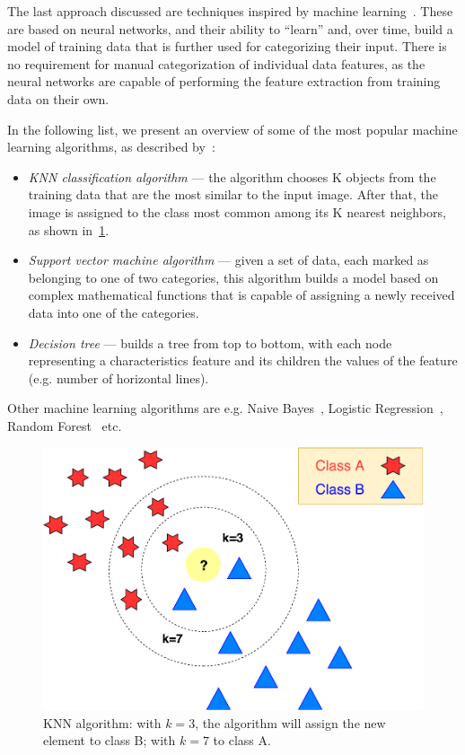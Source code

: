 The last approach discussed are techniques inspired by machine learning~\citep{sebastiani2002machine}. These are based on neural networks, and their ability to ``learn'' and, over time, build a model of training data that is further used for categorizing their input. There is no requirement for manual categorization of individual data features, as the neural networks are capable of performing the feature extraction from training data on their own.

In the following list, we present an overview of some of the most popular machine learning algorithms, as described by~\citet{bhavsar2012comparative}:
\begin{itemize}
    \item \emph{KNN classification algorithm} --- the algorithm chooses K objects from the training data that are the most similar to the input image. After that, the image is assigned to the class most common among its K nearest neighbors, as shown in~\cref{fig:characterClassKNN}.
    \item \emph{Support vector machine algorithm} --- given a set of data, each marked as belonging to one of two categories, this algorithm builds a model based on complex mathematical functions that is capable of assigning a newly received data into one of the categories.
    \item \emph{Decision tree} --- builds a tree from top to bottom, with each node representing a characteristics feature and its children the values of the feature (e.g. number of horizontal lines).
\end{itemize}
Other machine learning algorithms are e.g. Naive Bayes~\cite{ng2002discriminative}, Logistic Regression~\cite{ng2002discriminative}, Random Forest~\cite{segal2004machine} etc.

\begin{figure}[t]
\centering
\includegraphics[width=0.7\linewidth]{img/characterClassification/knn.pdf}
\caption{KNN algorithm: with $k=3$, the algorithm will assign the new element to class B; with $k=7$ to class A.} \label{fig:characterClassKNN}
\end{figure}


